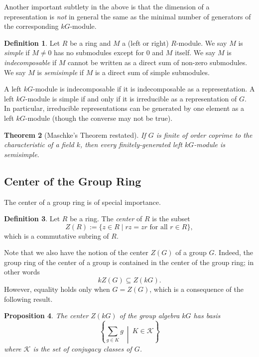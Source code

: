 \documentclass[12pt]{article}
\theoremstyle{plain}
\newtheorem{theorem}{Theorem}[section]
\newtheorem{proposition}[theorem]{Proposition}
\theoremstyle{definition}
\newtheorem{definition}[theorem]{Definition}
\theoremstyle{remark}
\numberwithin{equation}{section}
\begin{document}
Another important subtlety in the above is that the dimension of a
representation is \emph{not} in general the same as the minimal number
of generators of the corresponding $kG$-module.

\begin{definition}
Let $R$ be a ring and $M$ a (left or right) $R$-module.
We say $M$ is \emph{simple} if $M\ne 0$ has no submodules except for
$0$ and $M$ itself.
We say $M$ is \emph{indecomposable} if $M$ cannot be written as a direct sum of
non-zero submodules.
We say $M$ is \emph{semisimple} if $M$ is a direct sum of simple
submodules.
\end{definition}

A left $kG$-module is indecomposable if it is indecomposable as a
representation.
A left $kG$-module is simple if and only if it is irreducible
as a representation of $G$.
In particular, irreducible representations can be
generated by one element as a left $kG$-module (though the converse may not
be true).

\begin{theorem}[Maschke's Theorem restated]
If $G$ is finite of order coprime to the characteristic of a field $k$,
then every finitely-generated left $kG$-module is semisimple.
\end{theorem}

\subsection{Center of the Group Ring}

The center of a group ring is of special importance.

\begin{definition}
Let $R$ be a ring.
The \emph{center} of $R$ is the subset
\[
Z(R) := \{ z \in R \mid rz=zr \textrm{ for all } r \in R \},
\]
which is a commutative subring of $R$.
\end{definition}

Note that we also have the notion of the center $Z(G)$ of a group $G$.
Indeed, the group ring of the center of a group is contained in the
center of the group ring; in other words
\[
kZ(G) \subseteq Z(kG).
\]
However, equality holds only when $G=Z(G)$, which is a consequence of the
following result.

\begin{proposition}
The center $Z(kG)$ of the group algebra $kG$ has basis
\[
\left\{
\sum_{g \in K} g\ \middle|\ K \in \mathcal{K}
\right\}
\]
where $\mathcal{K}$ is the set of conjugacy classes of $G$.
\end{proposition}
\end{document}
